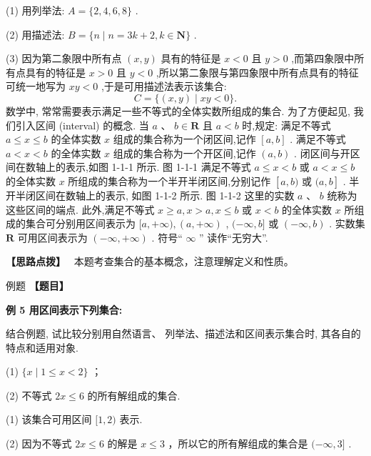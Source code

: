 \documentclass[a4paper,10pt,oneside,fontset=none]{ctexbook}
\renewcommand{\geq}{\geqslant}
\renewcommand{\leq}{\leqslant}
\newcounter{example}[chapter]
\newenvironment{example}[1][]{\begin{exBox}{例题}{#1}}{\end{exBox}}
\numberwithin{equation}{chapter}
\newenvironment{solution}{\begin{solutionBox}}{\end{solutionBox}}
\newenvironment{hint}{\begin{hintBox}\textbf{【思路点拨】}~}{\end{hintBox}}
\begin{document}
\begin{solution}
\par
(1)  用列举法: $A = \{ 2,4,6,8\}$ .
\par
(2) 用描述法: $B = \{ n \mid  n = {3k} + 2, k \in  \mathbf{N}\}$ .
\par
(3) 因为第二象限中所有点 $\left( {x, y}\right)$ 具有的特征是 $x < 0$ 且 $y > 0$ ,而第四象限中所有点具有的特征是 $x > 0$ 且 $y < 0$ ,所以第二象限与第四象限中所有点具有的特征可统一地写为 ${xy} < 0$ ,于是可用描述法表示该集合:
$$
C = \{ \left( {x, y}\right)  \mid  {xy} < 0\} .
$$
数学中, 常常需要表示满足一些不等式的全体实数所组成的集合. 为了方便起见, 我们引入区间 (interval) 的概念.
当 $a\text{ 、 }b \in  \mathbf{R}$ 且 $a < b$ 时,规定:
满足不等式 $a \leq  x \leq  b$ 的全体实数 $x$ 组成的集合称为一个闭区间,记作 $\left\lbrack  {a, b}\right\rbrack$ .
满足不等式 $a < x < b$ 的全体实数 $x$ 组成的集合称为一个开区间,记作 $\left( {a, b}\right)$ .
闭区间与开区间在数轴上的表示,如图 1-1-1 所示.
图 1-1-1
满足不等式 $a \leq  x < b$ 或 $a < x \leq  b$ 的全体实数 $x$ 所组成的集合称为一个半开半闭区间,分别记作 $\left\lbrack  {a, b)\text{ 或 }(a, b}\right\rbrack$ .
半开半闭区间在数轴上的表示, 如图 1-1-2 所示.
图 1-1-2
这里的实数 $a\text{ 、 }b$ 统称为这些区间的端点.
此外,满足不等式 $x \geq  a, x > a, x \leq  b$ 或 $x < b$ 的全体实数 $x$ 所组成的集合可分别用区间表示为 $\lbrack a, + \infty ),\left( {a, + \infty }\right)$ , $( - \infty , b\rbrack$ 或 $\left( {-\infty , b}\right)$ .
实数集 $\mathbf{R}$ 可用区间表示为 $\left( {-\infty , + \infty }\right)$ .
符号“ $\infty$ ” 读作“无穷大”.
\end{solution}

\begin{hint}
本题考查集合的基本概念，注意理解定义和性质。
\end{hint}

\begin{example}
\textbf{【题目】}\par\vspace{0.3em}
\textbf{例 5 用区间表示下列集合:}\par\vspace{0.3em}
结合例题, 试比较分别用自然语言、 列举法、描述法和区间表示集合时, 其各自的特点和适用对象.
\par
(1)  $\{ x \mid  1 \leq  x < 2\}$ ；
\par
(2) 不等式 ${2x} \leq  6$ 的所有解组成的集合.
\end{example}

\begin{solution}
\par
(1)  该集合可用区间 $\lbrack 1,2)$ 表示.
\par
(2) 因为不等式 ${2x} \leq  6$ 的解是 $x \leq  3$ ，所以它的所有解组成的集合是 $( - \infty ,3\rbrack$ .
\end{solution}
\end{document}
